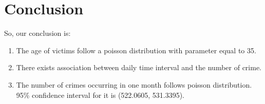 \documentclass[UTF8]{article}
\begin{document}
\section{Conclusion}

So, our conclusion is:

\begin{enumerate}
    \item The age of victims follow a poisson distribution with parameter equal to 35.
    \item There exists association between daily time interval and the number of crime.
    \item The number of crimes occurring in one month follows poisson distribution. 95\% confidence interval for it is (522.0605, 531.3395).
\end{enumerate}
\end{document}
